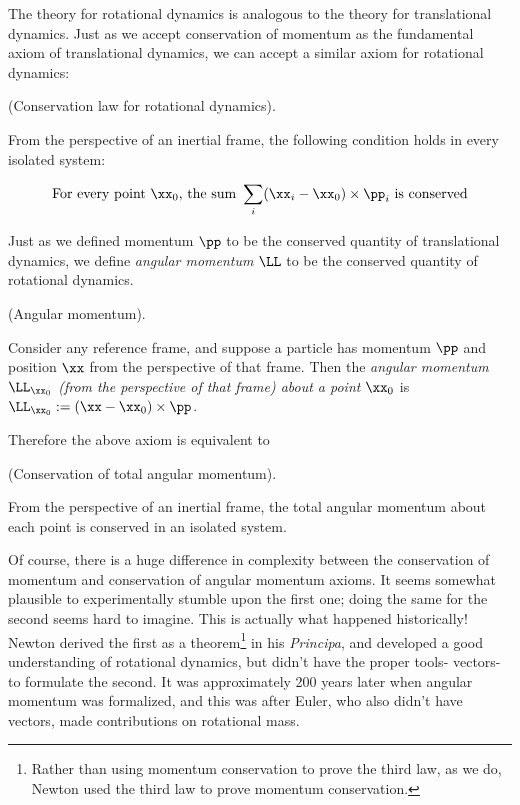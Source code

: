 \documentclass{article}
\begin{document}
The theory for rotational dynamics is analogous to the theory for translational dynamics. Just as we accept conservation of momentum as the fundamental axiom of translational dynamics, we can accept a similar axiom for rotational dynamics:

\begin{axiom}
    (Conservation law for rotational dynamics).

    From the perspective of an inertial frame, the following condition holds in every isolated system:

    \begin{align*}
        \text{For every point $\xx_0$, the sum }  \sum_i (\xx_i - \xx_0) \times \pp_i \text{ is conserved}
    \end{align*}
\end{axiom}

Just as we defined momentum $\pp$ to be the conserved quantity of translational dynamics, we define \textit{angular momentum} $\LL$ to be the conserved quantity of rotational dynamics.

\begin{defn}
    (Angular momentum).

    Consider any reference frame, and suppose a particle has momentum $\pp$ and position $\xx$ from the perspective of that frame. Then the \textit{angular momentum $\LL_{\xx_0}$ (from the perspective of that frame) about a point $\xx_0$} is $\LL_{\xx_0} := (\xx - \xx_0) \times \pp$.
\end{defn}

Therefore the above axiom is equivalent to

\begin{axiom}
    (Conservation of total angular momentum).

    From the perspective of an inertial frame, the total angular momentum about each point is conserved in an isolated system.
\end{axiom}

Of course, there is a huge difference in complexity between the conservation of momentum and conservation of angular momentum axioms. It seems somewhat plausible to experimentally stumble upon the first one; doing the same for the second seems hard to imagine. This is actually what happened historically! Newton derived the first as a theorem\footnote{Rather than using momentum conservation to prove the third law, as we do, Newton used the third law to prove momentum conservation.} in his \textit{Principa}, and developed a good understanding of rotational dynamics, but didn't have the proper tools- vectors- to formulate the second. It was approximately 200 years later when angular momentum was formalized, and this was after Euler, who also didn't have vectors, made contributions on rotational mass.
\end{document}
